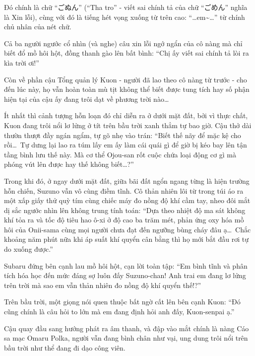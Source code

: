 \documentclass[../main.tex]{subfiles}
\begin{document}
Đó chính là chữ ``ごぬん'' (``Tha tro'' - viết sai chính tả của chữ ``ごめん'' nghĩa là Xin lỗi), cùng với đó là tiếng hét vọng xuống từ trên cao: ``\dots em\~{}\dots'' từ chính chủ nhân của nét chữ.


Cả ba người ngước cổ nhìn (và nghe) câu xin lỗi ngớ ngẩn của cô nàng mà chỉ biết đổ mồ hôi hột, đồng thanh gào lên bất bình: ``Chị ấy viết sai chính tả lòi ra kìa trời ơi!''

Còn về phần cậu Tổng quản lý Kuon - người đã lao theo cô nàng từ trước - cho đến lúc này, họ vẫn hoàn toàn mù tịt không thể biết được tung tích hay số phận hiện tại của cậu ấy đang trôi dạt về phương trời nào\dots

\omk

Ít nhất thì cảnh tượng hỗn loạn đó chỉ diễn ra ở dưới mặt đất, bởi vì thực chất, Kuon đang trôi nổi lơ lửng ở tít trên bầu trời xanh thẳm tự bao giờ. Cậu thở dài thườn thượt đầy ngán ngẩm, tự gõ nhẹ vào trán: ``Biết thế nãy để mặc kệ cho rồi\dots\ Tự dưng lại lao ra túm lấy em ấy làm cái quái gì để giờ bị kéo bay lên tận tầng bình lưu thế này. Mà cơ thể Ojou-san rốt cuộc chứa loại động cơ gì mà phóng vút lên được hay thế không biết\dots?''

Trong khi đó, ở ngay dưới mặt đất, giữa bãi đất ngổn ngang từng là hiện trường hỗn chiến, Suzuno vẫn vô cùng điềm tĩnh. Cô thản nhiên lôi từ trong túi áo ra một xấp giấy thử quỳ tím cùng chiếc máy đo nồng độ khí cầm tay, nheo đôi mắt dị sắc ngước nhìn lên không trung tính toán: ``Dựa theo nhiệt độ ma sát không khí tỏa ra và tốc độ tiêu hao ô-xi ở độ cao ba trăm mét, phản ứng oxy hóa mồ hôi của Onii-sama cùng mọi người chưa đạt đến ngưỡng bùng cháy đâu ạ\dots\ Chắc khoảng năm phút nữa khi áp suất khí quyển cân bằng thì họ mới bắt đầu rơi tự do xuống được.''

Subaru đứng bên cạnh lau mồ hôi hột, cạn lời toàn tập: ``Em bình tĩnh và phân tích hóa học đến mức đáng sợ luôn đấy Suzuno-chan! Anh trai em đang lơ lửng trên trời mà sao em vẫn thản nhiên đo nồng độ khí quyển thế!?''

Trên bầu trời, một giọng nói quen thuộc bất ngờ cất lên bên cạnh Kuon: ``Đó cũng chính là câu hỏi to lớn mà em đang định hỏi anh đấy, Kuon-senpai ạ.''

Cậu quay đầu sang hướng phát ra âm thanh, và đập vào mắt chính là nàng Cáo sa mạc Omaru Polka, người vẫn đang bình chân như vại, ung dung trôi nổi trên bầu trời như thể đang đi dạo công viên.
\end{document}
